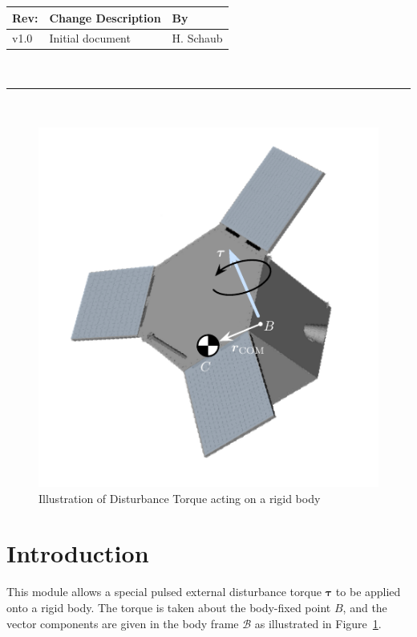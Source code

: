 \documentclass[]{BasiliskReportMemo}
\begin{document}
\makeCover


%
%
\pagestyle{empty}
{\renewcommand{\arraystretch}{1.1}
\noindent
\begin{longtable}{|p{0.5in}|p{4.5in}|p{1.14in}|}
\hline
{\bfseries Rev}: & {\bfseries Change Description} & {\bfseries By} \\
\hline
v1.0 & Initial document & H. Schaub \\
\hline

\end{longtable}
}

\newpage
\setcounter{page}{1}
\pagestyle{fancy}

\tableofcontents
~\\ \hrule ~\\


\begin{figure}[htb]
	\centerline{
	\includegraphics[]{Figures/TorqueDiagram1}
	}
	\caption{Illustration of Disturbance Torque acting on a rigid body}
	\label{fig:extPulse1}
\end{figure}
\section{Introduction}
This module allows a special pulsed external disturbance torque $\bm \tau$ to be applied onto a rigid body.   The torque is taken about the body-fixed point $B$, and the vector components are given in the body frame $\mathcal{B}$ as illustrated in Figure~\ref{fig:extPulse1}.  
\end{document}
